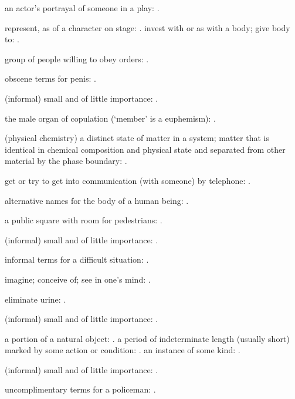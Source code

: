   an actor's portrayal of someone in a play: .

  represent, as of a character on stage: . invest with or as with a body; give body to: .

  group of people willing to obey orders: .

  obscene terms for penis: .

  (informal) small and of little importance: .

  the male organ of copulation (`member' is a euphemism): .

  (physical chemistry) a distinct state of matter in a system; matter that is identical in chemical composition and physical state and separated from other material by the phase boundary: .

  get or try to get into communication (with someone) by telephone: .

  alternative names for the body of a human being: .

  a public square with room for pedestrians: .

  (informal) small and of little importance: .

  informal terms for a difficult situation: .

  imagine; conceive of; see in one's mind: .

  eliminate urine: .

  (informal) small and of little importance: .

  a portion of a natural object: . a period of indeterminate length (usually short) marked by some action or condition: . an instance of some kind: .

  (informal) small and of little importance: .

  uncomplimentary terms for a policeman: .

